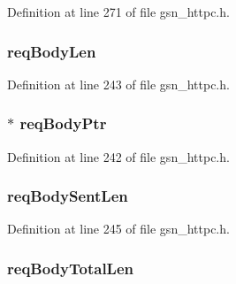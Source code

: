 Definition at line 271 of file gsn\_\-httpc.h.

\hypertarget{a00093_a58695d31385d9e33538edf494e1cff76}{
\subsubsection[{reqBodyLen}]{ {\bf reqBodyLen}}}
\label{a00093_a58695d31385d9e33538edf494e1cff76}


Definition at line 243 of file gsn\_\-httpc.h.

\hypertarget{a00093_ada90e2ecee9c50c7d2018d6e394492f1}{
\subsubsection[{reqBodyPtr}]{$\ast$ {\bf reqBodyPtr}}}
\label{a00093_ada90e2ecee9c50c7d2018d6e394492f1}


Definition at line 242 of file gsn\_\-httpc.h.

\hypertarget{a00093_ad2788be66932fd0137193d01dff57d90}{
\subsubsection[{reqBodySentLen}]{ {\bf reqBodySentLen}}}
\label{a00093_ad2788be66932fd0137193d01dff57d90}


Definition at line 245 of file gsn\_\-httpc.h.

\hypertarget{a00093_af375053fba5740b0113160f149404c23}{
\subsubsection[{reqBodyTotalLen}]{ {\bf reqBodyTotalLen}}}
\label{a00093_af375053fba5740b0113160f149404c23}


